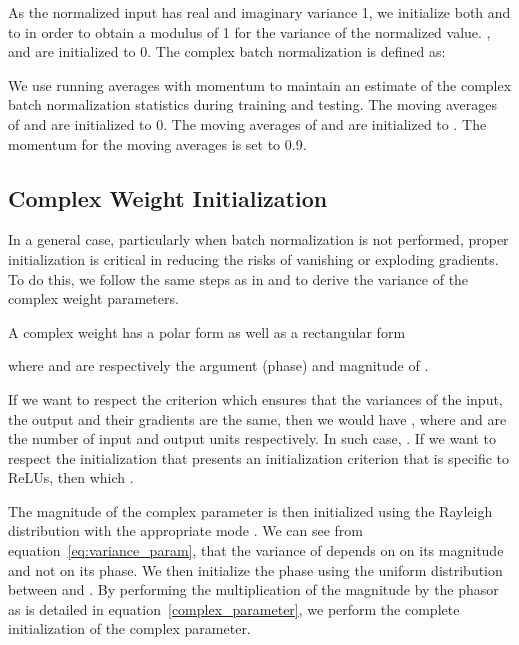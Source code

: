 \documentclass{article}
\begin{document}
As the normalized input  has real and imaginary variance 1, we initialize both 
and  to  in order to obtain a modulus of 1 for the variance of the normalized value. ,  and  are initialized to 0. 
The complex batch normalization is defined as:

We use running averages with momentum to maintain an estimate of the complex batch normalization statistics during training and testing. The moving averages of  and  are initialized to 0. The moving averages of  and  are initialized to . The momentum for the moving averages is set to 0.9.

\subsection{Complex Weight Initialization}
\label{sec:complex_init}
In a general case, particularly when batch normalization is not performed, proper initialization is critical in reducing the risks of vanishing or exploding gradients. To do this, we follow the same steps as in \citet{glorot2010understanding} and \citet{he2015delving} to derive the variance of the complex weight parameters.

A complex weight has a polar form as well as a rectangular form

where  and  are respectively the argument (phase) and magnitude of .


If we want to respect the \citet{glorot2010understanding} criterion which ensures that the variances of the input, the output and their gradients are the same, then we would have , where  and  are the number of input and output units respectively. In such case, . If we want to respect the \citet{he2015delving} initialization that presents an initialization criterion that is specific to ReLUs, then  which .

The magnitude of the complex parameter  is then initialized using the Rayleigh distribution with the appropriate mode . 
We can see from equation~\ref{eq:variance_param}, that the variance of  depends on on its magnitude and not on its phase. We then initialize the phase using the uniform distribution between  and .
By performing the multiplication of the magnitude by the phasor as is detailed in equation~\ref{complex_parameter}, we perform the complete initialization of the complex parameter.
\end{document}
